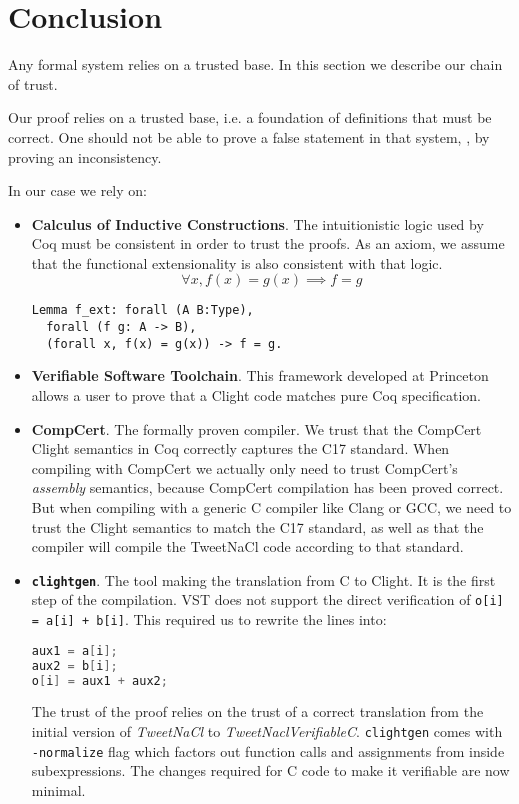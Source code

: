 \section{Conclusion}
\label{sec:Conclusion}

Any formal system relies on a trusted base. In this section we describe our
chain of trust.

Our proof relies on a trusted base, i.e. a foundation of definitions that must be
correct. One should not be able to prove a false statement in that system, \eg, by
proving an inconsistency.

In our case we rely on:
\begin{itemize}
  \item \textbf{Calculus of Inductive Constructions}. The intuitionistic logic
  used by Coq must be consistent in order to trust the proofs. As an axiom,
  we assume that the functional extensionality is also consistent with that logic.
  $$\forall x, f(x) = g(x) \implies f = g$$
\begin{lstlisting}[language=Coq]
Lemma f_ext: forall (A B:Type),
  forall (f g: A -> B),
  (forall x, f(x) = g(x)) -> f = g.
\end{lstlisting}

  \item \textbf{Verifiable Software Toolchain}. This framework developed at
  Princeton allows a user to prove that a Clight code matches pure Coq
  specification.

  \item \textbf{CompCert}. The formally proven compiler. We trust that the CompCert Clight semantics in Coq
  correctly captures the C17 standard.
  When compiling with CompCert we actually only need to trust CompCert's \emph{assembly} semantics, because CompCert compilation has been proved correct.
  But when compiling with a generic C compiler like Clang or GCC, we need to trust the Clight semantics to match the C17 standard, as well as
  that the compiler will compile the TweetNaCl code according to that standard.

  \item \textbf{\texttt{clightgen}}. The tool making the translation from {C} to
  {Clight}. It is the first step of the compilation.
  VST does not support the direct verification of \texttt{o[i] = a[i] + b[i]}.
  This required us to rewrite the lines into:
\begin{lstlisting}[language=C]
aux1 = a[i];
aux2 = b[i];
o[i] = aux1 + aux2;
\end{lstlisting}
  The trust of the proof relies on the trust of a correct translation from the
  initial version of \emph{TweetNaCl} to \emph{TweetNaclVerifiableC}.
  \texttt{clightgen} comes with \texttt{-normalize} flag which
  factors out function calls and assignments from inside subexpressions.
  The changes required for C code to make it verifiable are now minimal.


\end{itemize}
